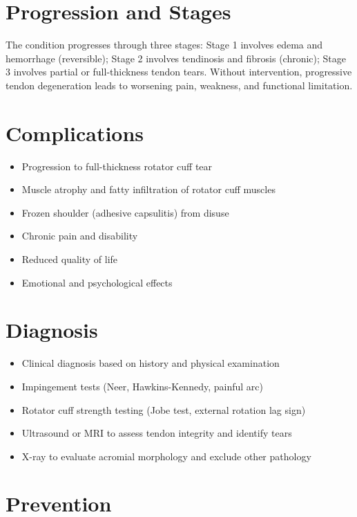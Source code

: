 \section{Progression and Stages}
The condition progresses through three stages: Stage 1 involves edema and hemorrhage (reversible); Stage 2 involves tendinosis and fibrosis (chronic); Stage 3 involves partial or full-thickness tendon tears. Without intervention, progressive tendon degeneration leads to worsening pain, weakness, and functional limitation.

\section{Complications}

\begin{itemize}[noitemsep]
  \item Progression to full-thickness rotator cuff tear
  \item Muscle atrophy and fatty infiltration of rotator cuff muscles
  \item Frozen shoulder (adhesive capsulitis) from disuse
  \item Chronic pain and disability
  \item Reduced quality of life
  \item Emotional and psychological effects
\end{itemize}

\section{Diagnosis}

\begin{itemize}[noitemsep]
  \item Clinical diagnosis based on history and physical examination
  \item Impingement tests (Neer, Hawkins-Kennedy, painful arc)
  \item Rotator cuff strength testing (Jobe test, external rotation lag sign)
  \item Ultrasound or MRI to assess tendon integrity and identify tears
  \item X-ray to evaluate acromial morphology and exclude other pathology
\end{itemize}

\section{Prevention}

